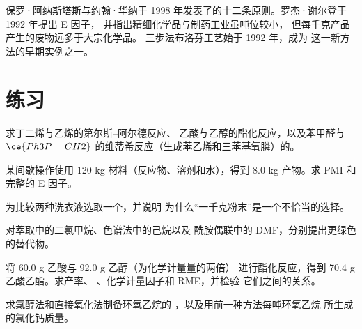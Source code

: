 \begin{history}[十二条原则与一个数字]
保罗·阿纳斯塔斯与约翰·华纳于
1998 年发表了的十二条原则。罗杰·谢尔登于 1992 年提出 E 因子，
并指出精细化学品与制药工业虽吨位较小，
但每千克产品产生的废物远多于大宗化学品。
三步法布洛芬工艺始于 1992 年，成为
这一新方法的早期实例之一。
\end{history}

\section{练习}

\begin{exercise}[$\star$]\label{exo:b3:green-industrial:1}
求丁二烯与乙烯的第尔斯–阿尔德反应、
乙酸与乙醇的酯化反应，以及苯甲醛与
$\ce{Ph3P=CH2}$ 的维蒂希反应（生成苯乙烯和三苯基氧膦）的。
\end{exercise}

\begin{exercise}[$\star$]\label{exo:b3:green-industrial:2}
某间歇操作使用 120 kg 材料（反应物、溶剂和水），得到
8.0 kg 产物。求 PMI 和完整的 E 因子。
\end{exercise}

\begin{exercise}[$\star$]\label{exo:b3:green-industrial:3}
为比较两种洗衣液选取一个，并说明
为什么“一千克粉末”是一个不恰当的选择。
\end{exercise}

\begin{exercise}[$\star$]\label{exo:b3:green-industrial:4}
对萃取中的二氯甲烷、色谱法中的己烷以及
酰胺偶联中的 DMF，分别提出更绿色的替代物。
\end{exercise}

\begin{exercise}[$\star\star$]\label{exo:b3:green-industrial:5}
将 60.0 g 乙酸与 92.0 g 乙醇（为化学计量量的两倍）
进行酯化反应，得到 70.4 g 乙酸乙酯。求产率、
、化学计量因子和 RME，并检验
它们之间的关系。
\end{exercise}

\begin{exercise}[$\star\star$]\label{exo:b3:green-industrial:6}
求氯醇法和直接氧化法制备环氧乙烷的
，以及用前一种方法每吨环氧乙烷
所生成的氯化钙质量。
\end{exercise}

